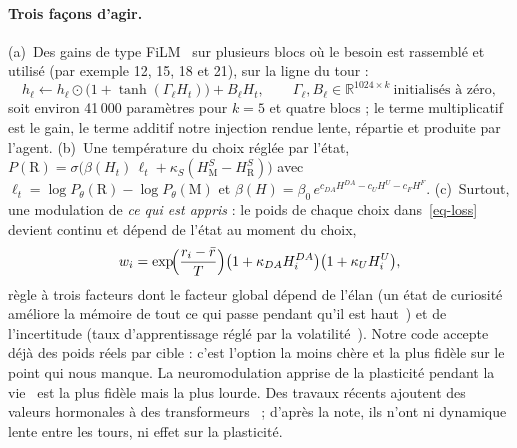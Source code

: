 \documentclass[11pt,a4paper]{article}
\begin{document}
\paragraph{Trois façons d'agir.} (a)~Des gains de type FiLM~\cite{perez2018} sur
plusieurs blocs où le besoin est rassemblé et utilisé (par exemple 12, 15, 18 et
21), sur la ligne du tour :
\begin{equation}
h_\ell\leftarrow h_\ell\odot\bigl(1+\tanh(\Gamma_\ell H_t)\bigr)+B_\ell H_t ,
\qquad \Gamma_\ell,B_\ell\in\mathbb R^{1024\times k}\ \text{initialisés à zéro},
\label{eq-film}
\end{equation}
soit environ 41\,000 paramètres pour $k=5$ et quatre blocs ; le terme multiplicatif
est le gain, le terme additif notre injection rendue lente, répartie et produite
par l'agent. (b)~Une température du choix réglée par l'état,
$P(\mathrm R)=\sigma\bigl(\beta(H_t)\,\ell_t+\kappa_S(H^S_\mathrm M-H^S_\mathrm R)\bigr)$ avec
$\ell_t=\log P_\theta(\mathrm R)-\log P_\theta(\mathrm M)$ et
$\beta(H)=\beta_0\,e^{c_{DA}H^{DA}-c_UH^U-c_FH^F}$. (c)~Surtout, une modulation de
\emph{ce qui est appris} : le poids de chaque choix dans~\eqref{eq-loss} devient
continu et dépend de l'état au moment du choix,
\begin{equation}
w_i=\exp\!\Bigl(\frac{r_i-\bar r}{T}\Bigr)\bigl(1+\kappa_{DA}H^{DA}_i\bigr)\bigl(1+\kappa_UH^U_i\bigr),
\label{eq-plasticity}
\end{equation}
règle à trois facteurs dont le facteur global dépend de l'élan (un état de curiosité
améliore la mémoire de tout ce qui passe pendant qu'il est haut~\cite{gruber2014}) et
de l'incertitude (taux d'apprentissage réglé par la volatilité~\cite{yu2005,behrens2007}).
Notre code accepte déjà des poids réels par cible : c'est l'option la moins chère et
la plus fidèle sur le point qui nous manque. La neuromodulation apprise de la
plasticité pendant la vie~\cite{miconi2019} est la plus fidèle mais la plus lourde.
Des travaux récents ajoutent des valeurs \og hormonales \fg{} à des
transformeurs~\cite{reda2026} ; d'après la note, ils n'ont ni dynamique lente entre les
tours, ni effet sur la plasticité.
\end{document}
